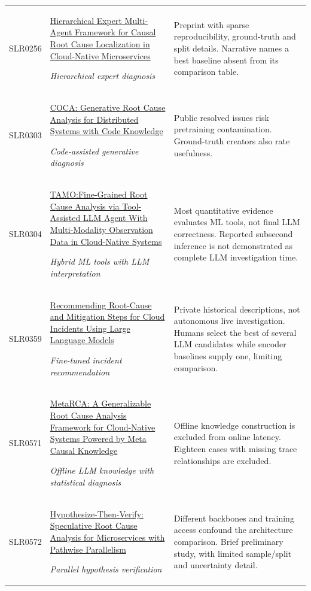 \begin{longtable}{@{}p{}p{}p{}@{}}
SLR0256 & \href{https://www.preprints.org/frontend/manuscript/41c58f87035172007cb15106de9bf93a/download_pub}{Hierarchical Expert Multi-Agent Framework for Causal Root Cause Localization in Cloud-Native Microservices}\par\emph{Hierarchical expert diagnosis} & Preprint with sparse reproducibility, ground-truth and split details. Narrative names a best baseline absent from its comparison table. \\
SLR0303 & \href{https://arxiv.org/pdf/2503.23051}{COCA: Generative Root Cause Analysis for Distributed Systems with Code Knowledge}\par\emph{Code-assisted generative diagnosis} & Public resolved issues risk pretraining contamination. Ground-truth creators also rate usefulness. \\
SLR0304 & \href{https://doi.org/10.1109/tsc.2025.3629066}{TAMO:Fine-Grained Root Cause Analysis via Tool-Assisted LLM Agent With Multi-Modality Observation Data in Cloud-Native Systems}\par\emph{Hybrid ML tools with LLM interpretation} & Most quantitative evidence evaluates ML tools, not final LLM correctness. Reported subsecond inference is not demonstrated as complete LLM investigation time. \\
SLR0359 & \href{https://arxiv.org/pdf/2301.03797}{Recommending Root-Cause and Mitigation Steps for Cloud Incidents Using Large Language Models}\par\emph{Fine-tuned incident recommendation} & Private historical descriptions, not autonomous live investigation. Humans select the best of several LLM candidates while encoder baselines supply one, limiting comparison. \\
SLR0571 & \href{https://arxiv.org/pdf/2603.02032}{MetaRCA: A Generalizable Root Cause Analysis Framework for Cloud-Native Systems Powered by Meta Causal Knowledge}\par\emph{Offline LLM knowledge with statistical diagnosis} & Offline knowledge construction is excluded from online latency. Eighteen cases with missing trace relationships are excluded. \\
SLR0572 & \href{https://arxiv.org/pdf/2601.02736}{Hypothesize-Then-Verify: Speculative Root Cause Analysis for Microservices with Pathwise Parallelism}\par\emph{Parallel hypothesis verification} & Different backbones and training access confound the architecture comparison. Brief preliminary study, with limited sample/split and uncertainty detail. \\

\end{longtable}
